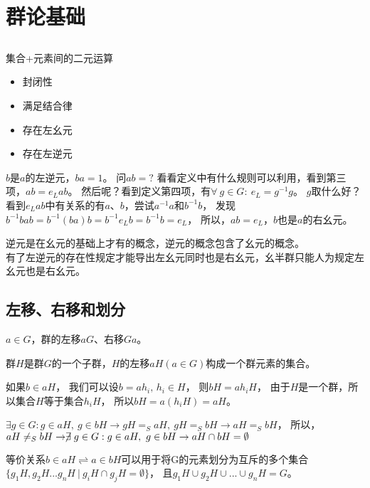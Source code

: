 \section{群论基础}

\subsection{}

\noindent 集合+元素间的二元运算
\begin{itemize}
    \item 封闭性
    \item 满足结合律
    \item 存在左幺元
    \item 存在左逆元
\end{itemize}

$b$是$a$的左逆元，$ba=1$。
问$ab=?$
看看定义中有什么规则可以利用，看到第三项，$ab=e_{L}ab$。
然后呢？看到定义第四项，有$\forall\ g\in G:\ e_{L}=g^{-1}g$。
$g$取什么好？看到$e_{L}ab$中有关系的有$a$、$b$，尝试$a^{-1}a$和$b^{-1}b$，
发现$b^{-1}bab=b^{-1}(ba)b=b^{-1}e_{L}b=b^{-1}b=e_{L}$，
所以，$ab=e_{L}$，$b$也是$a$的右幺元。

逆元是在幺元的基础上才有的概念，逆元的概念包含了幺元的概念。\\
有了左逆元的存在性规定才能导出左幺元同时也是右幺元，幺半群只能人为规定左幺元也是右幺元。

\subsection{左移、右移和划分}

$a\in G$，群的左移$aG$、右移$Ga$。

群$H$是群$G$的一个子群，$H$的左移$aH(a\in G)$构成一个群元素的集合。

如果$b\in aH$，
我们可以设$b= ah_{i},\,h_{i}\in H$，
则$bH=ah_{i}H$，
由于$H$是一个群，所以集合$H$等于集合$h_{i}H$，
所以$bH=a(h_{i}H)=aH$。

$\exists g\in G:g\in aH,\ g\in bH\rightarrow gH=_{S}aH,\ gH=_{S}bH\rightarrow aH=_{S}bH$，
所以，$aH\neq_{S} bH\rightarrow \centernot\exists g\in G:g\in aH,\ g\in bH\rightarrow aH\cap bH=\emptyset$

等价关系$b\in aH\rightleftharpoons a\in bH$可以用于将G的元素划分为互斥的多个集合
$\{g_{1}H,g_{2}H...g_{n}H\ |\ g_{i}H\cap g_{j}H=\emptyset\}$，
且$g_{1}H\cup g_{2}H\cup ...\cup g_{n}H=G$。

